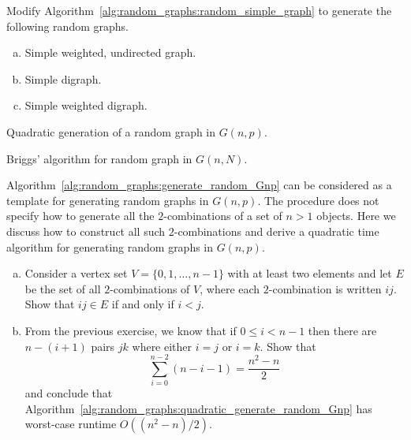 \begin{problem}
\item Modify Algorithm~\ref{alg:random_graphs:random_simple_graph} to
  generate the following random graphs.
  \begin{enumerate}[(a)]
  \item Simple weighted, undirected graph.

  \item Simple digraph.

  \item Simple weighted digraph.
  \end{enumerate}

\begin{algorithm}[!htbp]

\caption{Quadratic generation of a random graph in $G(n,p)$.}
\label{alg:random_graphs:quadratic_generate_random_Gnp}
\end{algorithm}

\begin{algorithm}[!htbp]

\caption{Briggs' algorithm for random graph in $G(n,N)$.}
\label{alg:random_graphs:Briggs_random_GnN}
\end{algorithm}

\item\label{prob:random_graphs:quadratic_generate_random_Gnp}
  Algorithm~\ref{alg:random_graphs:generate_random_Gnp} can be
  considered as a template for generating random graphs in
  $G(n,p)$. The procedure does not specify how to generate all the
  $2$-combinations of a set of $n > 1$ objects. Here we discuss how to
  construct all such $2$-combinations and derive a quadratic time
  algorithm for generating random graphs in $G(n,p)$.
  \begin{enumerate}[(a)]
  \item Consider a vertex set $V = \{0, 1, \dots, n - 1\}$ with at
    least two elements and let $E$ be the set of all $2$-combinations
    of $V$, where each $2$-combination is written $ij$. Show that
    $ij \in E$ if and only if $i < j$.

  \item From the previous exercise, we know that if $0 \leq i < n - 1$
    then there are $n - (i + 1)$ pairs $jk$ where either $i = j$ or
    $i = k$. Show that
    \[
    \sum_{i=0}^{n-2} (n - i - 1)
    =
    \frac{n^2 - n}{2}
    \]
    and conclude that
    Algorithm~\ref{alg:random_graphs:quadratic_generate_random_Gnp}
    has worst-case runtime $O((n^2 - n) / 2)$.
  \end{enumerate}


\end{problem}

